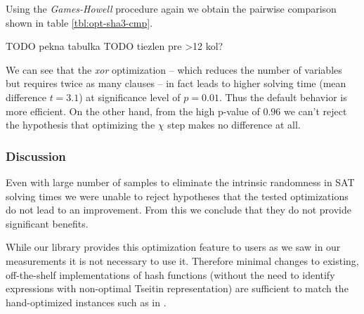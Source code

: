 Using the \emph{Games-Howell} procedure again we obtain the pairwise comparison shown in table \ref{tbl:opt-sha3-cmp}.

TODO pekna tabulka
TODO tiezlen pre >12 kol?

We can see that the \emph{xor} optimization -- which reduces the number of variables but requires twice as many clauses -- in fact leads to higher solving time (mean difference $t=3.1$) at significance level of $p=0.01$.
Thus the default behavior is more efficient.
On the other hand, from the high p-value of $0.96$ we can't reject the hypothesis that optimizing the $\chi$ step makes no difference at all.

%

\subsubsection{Discussion}
Even with large number of samples to eliminate the intrinsic randomness in SAT solving times we were unable to reject hypotheses that the tested optimizations do not lead to an improvement.
From this we conclude that they do not provide significant benefits.

While our library provides this optimization feature to users as we saw in our measurements it is not necessary to use it.
Therefore minimal changes to existing, off-the-shelf implementations of hash functions (without the need to identify expressions with non-optimal Tseitin representation) are sufficient to match the hand-optimized instances such as in \cite{nossum2012sat}.



